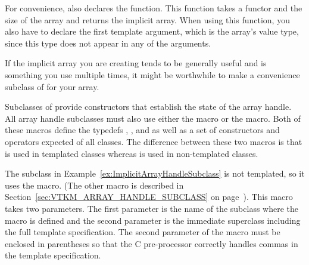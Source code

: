 
For convenience,  also
declares the  function. This function
takes a functor and the size of the array and returns the implicit array.
When using this function, you also have to declare the first template
argument, which is the array's value type, since this type does not appear
in any of the arguments.



If the implicit array you are creating tends to be generally useful and is
something you use multiple times, it might be worthwhile to make a
convenience subclass of  for your array.


Subclasses of  provide constructors that
establish the state of the array handle. All array handle subclasses must
also use either the  macro or the
 macro. Both of these macros
define the typedefs , , and
 as well as a set of constructors and operators
expected of all  classes. The difference
between these two macros is that 
is used in templated classes whereas
 is used in non-templated
classes.

The  subclass in
Example~\ref{ex:ImplicitArrayHandleSubclass} is not templated, so it uses
the  macro. (The other macro
is described in Section~\ref{sec:VTKM_ARRAY_HANDLE_SUBCLASS} on
page~\pageref{sec:VTKM_ARRAY_HANDLE_SUBCLASS}). This macro takes two
parameters. The first parameter is the name of the subclass where the macro
is defined and the second parameter is the immediate superclass including
the full template specification. The second parameter of the macro must be
enclosed in parentheses so that the C pre-processor correctly handles
commas in the template specification.

